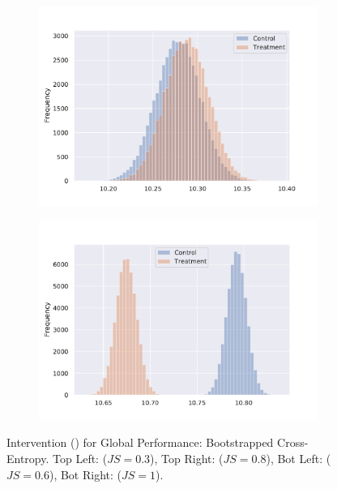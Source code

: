 \begin{exmp}
\begin{figure}[h]
\begin{subfigure}[b]{0.46\linewidth}
  \end{subfigure}
  \begin{subfigure}[b]{0.46\linewidth}
    \includegraphics[width=\linewidth]{graphics/preliminaries/association/cross-entropy-tf1-distribution-clone3-300dpi.pdf}
  \end{subfigure}
  \begin{subfigure}[b]{0.46\linewidth}
    \includegraphics[width=\linewidth]{graphics/preliminaries/association/cross-entropy-tf2-distribution-clone3-300dpi.pdf}
  \end{subfigure}
  \vspace{-0.2cm}
  \caption{\datainterII Intervention (\BigCloneIIITB) for Global Performance: Bootstrapped Cross-Entropy. Top Left: \rnn ($JS=0.3$), Top Right: \gru ($JS=0.8$), Bot Left: \tf ($JS=0.6$), Bot Right: \tfi ($JS=1$).}
  \label{fig:jssimilarity}
  \vspace{-0.3cm}
\end{figure}

\end{exmp}

